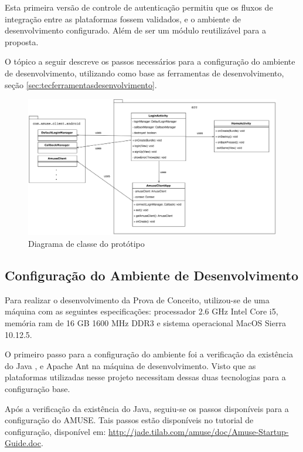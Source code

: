   Esta primeira versão de controle de autenticação permitiu que os fluxos de
  integração entre as plataformas fossem validados, e o ambiente de
  desenvolvimento configurado. Além de ser um módulo reutilizável para a
  proposta.

  O tópico a seguir descreve os passos necessários para a configuração do
  ambiente de desenvolvimento, utilizando como base as ferramentas de
  desenvolvimento, seção \ref{sec:tecferramentasdesenvolvimento}.

  \begin{figure}[h]
    \centering
    \includegraphics[width=16cm]{figuras/class_diagram_prototype}
    \caption{Diagrama de classe do protótipo }
    \label{figura:class_diagram_prototype}
  \end{figure}

  \subsection{Configuração do Ambiente de Desenvolvimento}
  \label{subsec:configambiente}

  Para realizar o desenvolvimento da Prova de Conceito, utilizou-se de uma
  máquina com as seguintes especificações: processador 2.6 GHz Intel Core i5,
  memória ram de 16 GB 1600 MHz DDR3 e sistema operacional MacOS Sierra 10.12.5.

  O primeiro passo para a configuração do ambiente foi a verificação da
  existência do Java \cite{java}, e Apache Ant \cite{ant} na máquina de
  desenvolvimento. Visto que as plataformas utilizadas nesse projeto
  necessitam dessas duas tecnologias para a configuração base.

  Após a verificação da existência do Java, seguiu-se os passos disponíveis para
  a configuração do AMUSE. Tais passos estão disponíveis no tutorial de
  configuração, disponível em:
  \url{http://jade.tilab.com/amuse/doc/Amuse-Startup-Guide.doc}.

